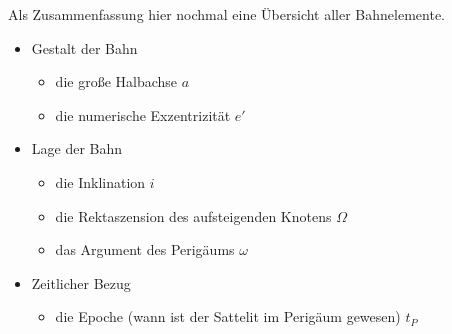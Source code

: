 \newpar
Als Zusammenfassung hier nochmal eine Übersicht aller Bahnelemente. 
\begin{itemize}
	\item Gestalt der Bahn
	\begin{itemize}
		\item die große Halbachse \ensuremath{a}
		\item die numerische Exzentrizität \ensuremath{e'}
	\end{itemize}
	\item Lage der Bahn
	\begin{itemize}
		\item die Inklination \ensuremath{i}
		\item die Rektaszension des aufsteigenden Knotens \ensuremath{\Omega}
		\item das Argument des Perigäums \ensuremath{\omega}
	\end{itemize}
	\item Zeitlicher Bezug
	\begin{itemize}
		\item die Epoche (wann ist der Sattelit im Perigäum gewesen) \ensuremath{t_P}
	\end{itemize}
\end{itemize} 

